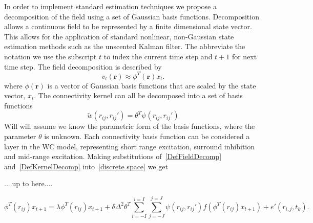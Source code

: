 \documentclass[onecolumn,draftcls]{IEEEtran}
\begin{document}
In order to implement standard estimation techniques we propose a decomposition of the field using a set of Gaussian basis functions. Decomposition allows a continuous field to be represented by a finite dimensional state vector. This allows for the application of standard nonlinear, non-Gaussian state estimation methods such as the unscented Kalman filter. The abbreviate the notation we use the subscript $t$ to index the current time step and $t+1$ for next time step. The field decomposition is described by
\begin{equation}\label{DefFieldDecomp}
v_t\left( \mathbf{r} \right) \approx \phi ^T\left( \mathbf{r} \right) x_t.
\end{equation}
where $\phi(\mathbf{r})$ is a vector of Gaussian basis functions that are scaled by the state vector, $x_t$. The connectivity kernel can all be decomposed into a set of basis functions
\begin{equation}\label{DefKernelDecomp}
\tilde{w}( r_{ij}, r_{ij}' ) = \theta^T\psi\left(r_{ij},r_{ij}'\right)
\end{equation}
Will will assume we know the parametric form of the basis functions, where the parameter $\theta$ is unknown. Each connectivity basis function can be considered a layer in the WC model, representing short range excitation, surround inhibition and mid-range excitation. Making substitutions of~\ref{DefFieldDecomp} and~\ref{DefKernelDecomp} into~\ref{discrete space} we get

....up to here....

\begin{equation}\label{reduced discrete model}
	\phi ^T\left( r_{ij} \right)x_{t+1} =  \lambda \phi ^T\left( r_{ij} \right)x_{t+1} + \delta \Delta^2 \theta^T \sum_{i=-I}^{i=I}{\sum_{j=-J}^{j=J}{\psi\left(r_{ij},r_{ij}'\right)f\left( \phi ^T\left(r_{ij} \right)x_{t+1} \right)} }+ e'(r_{i,j},t_k).
\end{equation}
\end{document}
